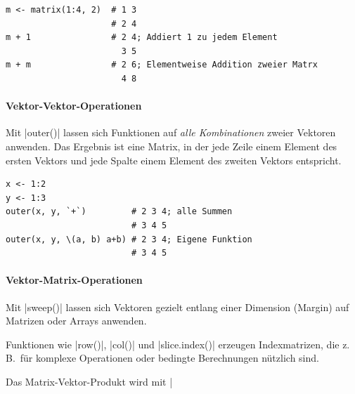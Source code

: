 \documentclass[10pt,twocolumn]{scrartcl}
\renewcommand{\lstinline}{\mycoloredinline}
\begin{document}
\begin{lstlisting}
m <- matrix(1:4, 2)  # 1 3
                     # 2 4
m + 1                # 2 4; Addiert 1 zu jedem Element
                       3 5
m + m                # 2 6; Elementweise Addition zweier Matrx
                       4 8
\end{lstlisting}


\paragraph{Vektor-Vektor-Operationen}

Mit \lstinline|outer()| lassen sich Funktionen auf \emph{alle Kombinationen} zweier Vektoren anwenden. 
Das Ergebnis ist eine Matrix, in der jede Zeile einem Element des ersten Vektors und jede Spalte einem Element des zweiten Vektors entspricht.

\begin{lstlisting}
x <- 1:2
y <- 1:3
outer(x, y, `+`)         # 2 3 4; alle Summen
                         # 3 4 5
outer(x, y, \(a, b) a+b) # 2 3 4; Eigene Funktion
                         # 3 4 5
\end{lstlisting}


\paragraph{Vektor-Matrix-Operationen}

Mit \lstinline|sweep()| lassen sich Vektoren gezielt entlang einer Dimension (Margin) auf Matrizen oder Arrays anwenden.

Funktionen wie \lstinline|row()|, \lstinline|col()| und \lstinline|slice.index()| erzeugen Indexmatrizen, die z.\,B.\ für komplexe Operationen oder bedingte Berechnungen nützlich sind.

Das Matrix-Vektor-Produkt wird mit \lstinline|%*%| durchgeführt. Alternativen für spezielle Produkte sind \lstinline|crossprod()| und \lstinline|tcrossprod()|. Eine Matix kann man mit \lstinline|t()| transponieren. Mit \lstinline|%x%| erhält man das Kronecker-Produkt.
\end{document}
